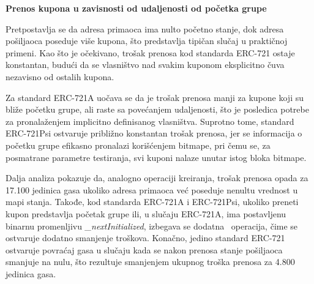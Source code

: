 \begin{description}
\text{}

\item \textbf{Prenos kupona u zavisnosti od udaljenosti od početka grupe}

Pretpostavlja se da adresa primaoca ima nulto početno stanje, dok adresa pošiljaoca poseduje više kupona, što predstavlja tipičan slučaj u praktičnoj primeni. Kao što je očekivano, trošak prenosa kod standarda ERC-721 ostaje konstantan, budući da se vlasništvo nad svakim kuponom eksplicitno čuva nezavisno od ostalih kupona.

Za standard ERC-721A uočava se da je trošak prenosa manji za kupone koji su bliže početku grupe, ali raste sa povećanjem udaljenosti, što je posledica potrebe za pronalaženjem implicitno definisanog vlasništva. Suprotno tome, standard ERC-721Psi ostvaruje približno konstantan trošak prenosa, jer se informacija o početku grupe efikasno pronalazi korišćenjem bitmape, pri čemu se, za posmatrane parametre testiranja, svi kuponi nalaze unutar istog bloka bitmape.

Dalja analiza pokazuje da, analogno operaciji kreiranja, trošak prenosa opada za 17.100 jedinica gasa ukoliko adresa primaoca već poseduje nenultu vrednost u mapi stanja. Takođe, kod standarda ERC-721A i ERC-721Psi, ukoliko preneti kupon predstavlja početak grupe ili, u slučaju ERC-721A, ima postavljenu binarnu promenljivu \textit{\_nextInitialized}, izbegava se dodatna \Sj\ operacija, čime se ostvaruje dodatno smanjenje troškova. Konačno, jedino standard ERC-721 ostvaruje povraćaj gasa u slučaju kada se nakon prenosa stanje pošiljaoca smanjuje na nulu, što rezultuje smanjenjem ukupnog troška prenosa za 4.800 jedinica gasa.

\begin{rezultati}[H]
\centering

\begin{minipage}{0.48\textwidth}
\centering


\end{minipage}
\end{rezultati}
\end{description}
